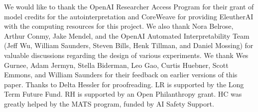 We would like to thank the OpenAI Researcher Access Program for their grant of model credits for the autointerpretation and CoreWeave for providing EleutherAI with the computing resources for this project. We also thank Nora Belrose, Arthur Conmy, Jake Mendel, and the OpenAI Automated Interpretability Team (Jeff Wu, William Saunders, Steven Bills, Henk Tillman,
and Daniel Mossing) for valuable discussions regarding the design of various experiments. We thank Wes Gurnee, Adam Jermyn, Stella Biderman, Leo Gao, Curtis Huebner, Scott Emmons, and William Saunders for their feedback on earlier versions of this paper. Thanks to Delta Hessler for proofreading. LR is supported by the Long Term Future Fund. RH is supported by an Open Philanthropy grant. HC was greatly helped by the MATS program, funded by AI Safety Support.
